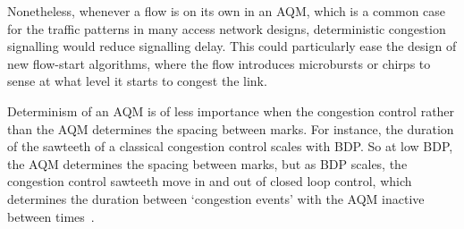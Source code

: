 Nonetheless, whenever a flow is on its own in an AQM, which is a common case for the traffic patterns in many access network designs,  deterministic congestion signalling would reduce signalling delay. This could particularly ease the design of new flow-start algorithms, where the flow introduces microbursts or chirps to sense at what level it starts to congest the link.

Determinism of an AQM is of less importance when the congestion control rather than the AQM determines the spacing between marks. For instance, the duration of the sawteeth of a classical congestion control scales with BDP. So at low BDP, the AQM determines the spacing between marks, but as BDP scales, the congestion control sawteeth move in and out of closed loop control, which determines the duration between `congestion events' with the AQM inactive between times~\cite[\S\,3.3]{Briscoe21c:pi2param}.